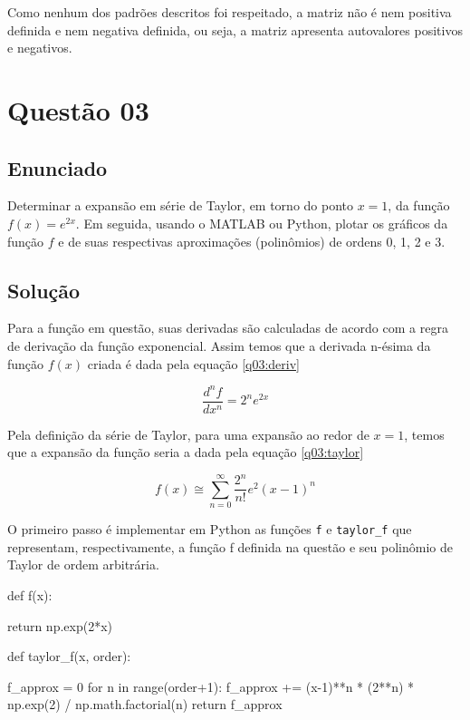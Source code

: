 \documentclass[10pt, a4paper]{article}
\begin{document}
Como nenhum dos padrões descritos foi respeitado, a matriz não é nem 
positiva definida e nem negativa definida, 
ou seja, a matriz apresenta autovalores positivos e negativos.


\section{Questão 03}\label{q03}

\subsection{Enunciado}

Determinar a expansão em série de Taylor, em torno do ponto $x = 1$, 
da função $f(x) = e^{2x}$. Em seguida, usando o MATLAB ou Python, 
plotar os gráficos da função $f$ e de suas respectivas aproximações
(polinômios) de ordens 0, 1, 2 e 3.

\subsection{Solução}

Para a função em questão, suas derivadas são calculadas de acordo com a regra de 
derivação da função exponencial. Assim temos que a derivada n-ésima da função 
$f(x)$ criada é dada pela equação \cref{q03:deriv}

\begin{equation}\label{q03:deriv}
    \frac{d^nf}{dx^n} = 2^n e^{2x}
\end{equation}

Pela definição da série de Taylor, para uma expansão ao redor de $x = 1$, temos 
que a expansão da função seria a dada pela equação \cref{q03:taylor}

\begin{equation}\label{q03:taylor}
    f(x) \cong \sum^{\infty}_{n=0} \frac{2^n}{n!} e^2 (x-1)^n
\end{equation}

O primeiro passo é implementar em Python as funções {\tt f} e {\tt taylor\_f} que 
representam, respectivamente, a função f definida na questão e seu polinômio 
de Taylor de ordem arbitrária.

\begin{python}
def f(x):

return np.exp(2*x)

def taylor_f(x, order):

f_approx = 0
for n in range(order+1):
    f_approx += (x-1)**n * (2**n) * np.exp(2) / np.math.factorial(n)
return f_approx
\end{python}
\end{document}
